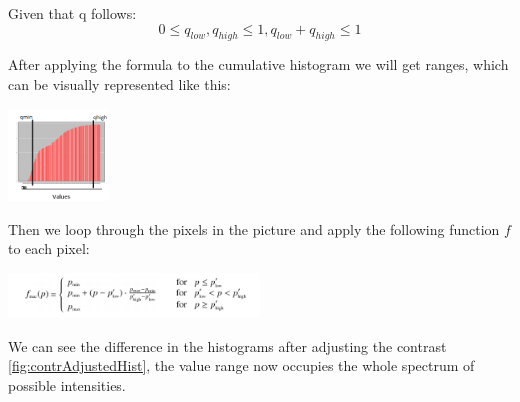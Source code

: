 \documentclass[journal,transmag]{IEEEtran}
\begin{document}
\noindent Given that q follows: 
\begin{equation}\label{eq:contrAdjQcalc}
0 \leq q_{low}, q_{high} \leq 1, q_{low} + q_{high} \leq 1
\end{equation}

\noindent After applying the formula to the cumulative histogram we will get ranges, which can be visually represented like this:
\begin{center}
	 \includegraphics[width=0.2\textwidth]{figures/cum_hist_range.png}
	 \label{fig:cumulativeHistRange}
\end{center}
Then we loop through the pixels in the picture and apply the following function $f$ to each pixel: 

\begin{center}
	\includegraphics[width=0.5\textwidth]{figures/contrAdjFormula.png}
	\label{fig:contrAdjFunc}
\end{center}

\noindent We can see the difference in the histograms after adjusting the contrast \ref{fig:contrAdjustedHist}, the value range now occupies the whole spectrum of possible intensities.
	
\end{document}
